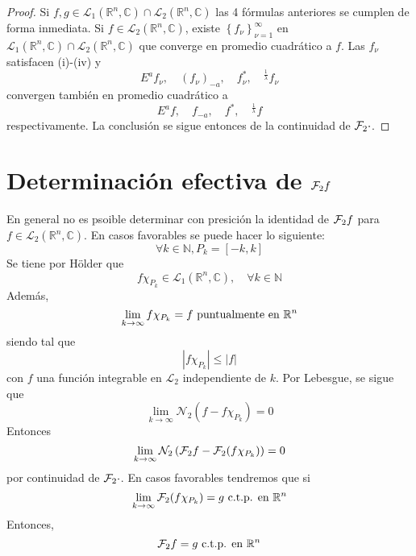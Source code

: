 \documentclass[12pt]{report}
\theoremstyle{largebreak}
\renewcommand{\leq}{\ensuremath{\leqslant}}
\newcommand\abs[1]{\ensuremath{\left|#1\right|}}
\newcommand{\N}[2]{\ensuremath{\mathcal{N}_{#1}\left(#2\right)}}
\newcommand{\fou}[1]{\ensuremath{\mathcal{F}#1}}
\begin{document}
    \begin{proof}
        Si $f,g\in\mathcal{L}_1(\mathbb{R}^n,\mathbb{C})\cap\mathcal{L}_2(\mathbb{R}^n,\mathbb{C})$ las 4 fórmulas anteriores se cumplen de forma inmediata. Si $f\in\mathcal{L}_2(\mathbb{R}^n,\mathbb{C})$, existe $\left\{f_\nu\right\}_{\nu=1}^\infty$ en $\mathcal{L}_1(\mathbb{R}^n,\mathbb{C})\cap\mathcal{L}_2(\mathbb{R}^n,\mathbb{C})$ que converge en promedio cuadrático a $f$. Las $f_\nu$ satisfacen (i)-(iv) y
        \begin{equation*}
            E^af_\nu,\quad (f_\nu)_{-a},\quad f_\nu^*,\quad ^{\frac{1}{\lambda}}f_\nu
        \end{equation*}
        convergen también en promedio cuadrático a 
        \begin{equation*}
            E^af,\quad f_{-a},\quad f^*,\quad ^{\frac{1}{\lambda}}f
        \end{equation*}
        respectivamente. La conclusión se sigue entonces de la continuidad de $\fou_2{\cdot}$.
    \end{proof}

    \section{Determinación efectiva de $\fou_2{f}$}
        
    En general no es psoible determinar con presición la identidad de $\fou_2{f}$ para $f\in\mathcal{L}_2(\mathbb{R}^n,\mathbb{C})$. En casos favorables se puede hacer lo siguiente:
    \begin{equation*}
        \forall k\in\mathbb{N}, P_k=[-k,k]
    \end{equation*}
    Se tiene por Hölder que
    \begin{equation*}
        f\chi_{ P_k}\in\mathcal{L}_1(\mathbb{R}^n,\mathbb{C}),\quad\forall k\in\mathbb{N}
    \end{equation*}
    Además,
    \begin{equation*}
        \lim_{k\rightarrow\infty}f\chi_{P_k}=f\textup{ puntualmente en }\mathbb{R}^n
    \end{equation*}
    siendo tal que
    \begin{equation*}
        \abs{f\chi_{ P_k}}\leq\abs{f}
    \end{equation*}
    con $f$ una función integrable en $\mathcal{L}_2$ independiente de $k$. Por Lebesgue, se sigue que
    \begin{equation*}
        \lim_{ k\rightarrow\infty}\N{2}{f-f\chi_{ P_k}}=0
    \end{equation*}
    Entonces
    \begin{equation*}
        \lim_{ k\rightarrow\infty}\N{2}{\fou_2{f}-\fou_2{(f\chi_{ P_k})}}=0
    \end{equation*}
    por continuidad de $\fou_2{\cdot}$. En casos favorables tendremos que si
    \begin{equation*}
        \lim_{ k\rightarrow\infty}\fou_2{(f\chi_{ P_k})}=g\textup{ c.t.p. en }\mathbb{R}^n
    \end{equation*}
    Entonces,
    \begin{equation*}
        \fou_2{f}=g\textup{ c.t.p. en }\mathbb{R}^n
    \end{equation*}
\end{document}

